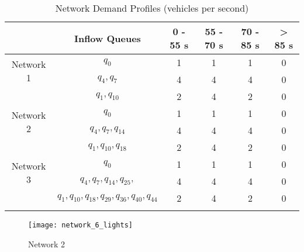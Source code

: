 \begin{table}[h]
\caption{Network Demand Profiles (vehicles per second)}
\label{tab:net1wave}
\centering
\begin{tabular}{cccccc}
\toprule
& Inflow Queues & 0 - 55 s & 55 - 70 s & 70 - 85 s & > 85 s\\
\midrule
\multirow{2}{*}{Network 1}&$q_0$ & 1 & 1 & 1 & 0 \\
&$q_4, q_7$ & 4 & 4 & 4 & 0 \\
&$q_1,q_{10}$& 2 & 4 & 2 & 0 \\
\midrule
\multirow{2}{*}{Network 2}&$q_0$ & 1 & 1 & 1 & 0 \\
&$q_4,q_7,q_{14}$& 4 & 4 & 4 & 0 \\
&$q_1, q_{10},q_{18}$ & 2 & 4 & 2 & 0 \\
\midrule
\multirow{2}{*}{Network 3}&$q_0$ & 1 & 1 & 1 & 0 \\
&$q_4,q_7,q_{14},q_{25},$& 4 & 4 & 4 & 0 \\
&$q_1, q_{10},q_{18},q_{29},q_{36},q_{40},q_{44}$ & 2 & 4 & 2 & 0 \\
\bottomrule\\
\end{tabular}
\end{table}



\begin{figure*}[t!]
\centering
\texttt{[image: network\_6\_lights]}
\caption{Network 2}
\label{fig:network6}
\end{figure*}

